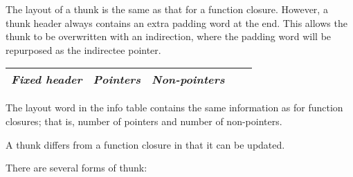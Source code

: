 \documentclass[11pt]{article}
\begin{document}
The layout of a thunk is the same as that for a function closure.
However, a thunk header always contains an extra padding word at the
end. This allows the thunk to be overwritten with an indirection,
where the padding word will be repurposed as the indirectee pointer.

\begin{center}
\begin{tabular}{|l|l|l|l|l|}\hline
\emph{Fixed header}  & \emph{Pointers} & \emph{Non-pointers} \\ \hline
\end{tabular}
\end{center}

The layout word in the info table contains the same information as for
function closures; that is, number of pointers and number of
non-pointers.

A thunk differs from a function closure in that it can be updated.

There are several forms of thunk:
\end{document}
